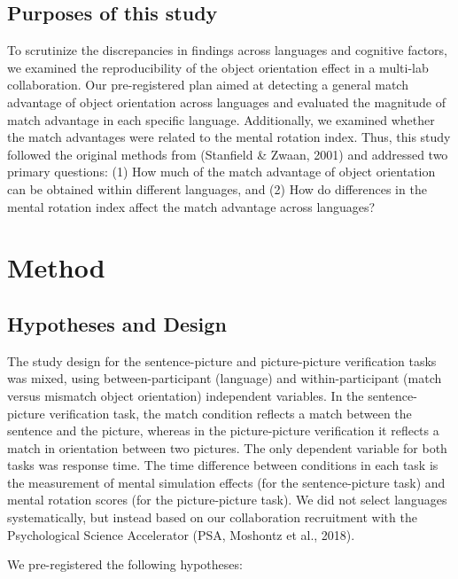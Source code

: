 \documentclass[
  man,floatsintext]{apa7}
\begin{document}
\hypertarget{purposes-of-this-study}{%
\subsection{Purposes of this study}\label{purposes-of-this-study}}

To scrutinize the discrepancies in findings across languages and
cognitive factors, we examined the reproducibility of the object
orientation effect in a multi-lab collaboration. Our pre-registered plan
aimed at detecting a general match advantage of object orientation
across languages and evaluated the magnitude of match advantage in each
specific language. Additionally, we examined whether the match
advantages were related to the mental rotation index. Thus, this study
followed the original methods from (Stanfield \& Zwaan, 2001) and
addressed two primary questions: (1) How much of the match advantage of
object orientation can be obtained within different languages, and (2)
How do differences in the mental rotation index affect the match
advantage across languages?

\hypertarget{method}{%
\section{Method}\label{method}}

\hypertarget{hypotheses-and-design}{%
\subsection{Hypotheses and Design}\label{hypotheses-and-design}}

The study design for the sentence-picture and picture-picture
verification tasks was mixed, using between-participant (language) and
within-participant (match versus mismatch object orientation)
independent variables. In the sentence-picture verification task, the
match condition reflects a match between the sentence and the picture,
whereas in the picture-picture verification it reflects a match in
orientation between two pictures. The only dependent variable for both
tasks was response time. The time difference between conditions in each
task is the measurement of mental simulation effects (for the
sentence-picture task) and mental rotation scores (for the
picture-picture task). We did not select languages systematically, but
instead based on our collaboration recruitment with the Psychological
Science Accelerator (PSA, Moshontz et al., 2018).

We pre-registered the following hypotheses:
\end{document}
